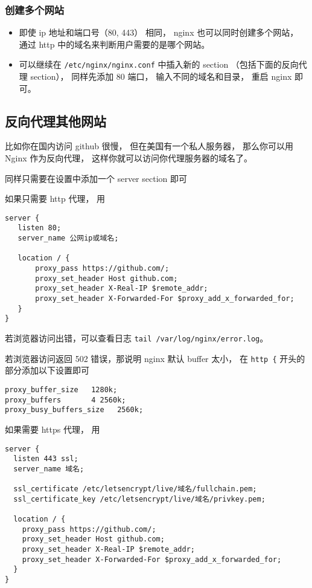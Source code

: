 \subsubsection{创建多个网站}
\begin{itemize}
\item 即使 ip 地址和端口号（80, 443） 相同， nginx 也可以同时创建多个网站， 通过 http 中的域名来判断用户需要的是哪个网站。
\item 可以继续在 \verb`/etc/nginx/nginx.conf` 中插入新的 section （包括下面的反向代理 section）， 同样先添加 80 端口， 输入不同的域名和目录， 重启 nginx 即可。
\end{itemize}


\subsection{反向代理其他网站}
比如你在国内访问 github 很慢， 但在美国有一个私人服务器， 那么你可以用 Nginx 作为反向代理， 这样你就可以访问你代理服务器的域名了。

同样只需要在设置中添加一个 server section 即可

如果只需要 http 代理， 用
\begin{lstlisting}[language=none]
server {
   listen 80;
   server_name 公网ip或域名;

   location / {
       proxy_pass https://github.com/;
       proxy_set_header Host github.com;
       proxy_set_header X-Real-IP $remote_addr;
       proxy_set_header X-Forwarded-For $proxy_add_x_forwarded_for;
   }
}
\end{lstlisting}

若浏览器访问出错，可以查看日志 \verb`tail /var/log/nginx/error.log`。

若浏览器访问返回 502 错误，那说明 nginx 默认 buffer 太小， 在 \verb`http {` 开头的部分添加以下设置即可
\begin{lstlisting}[language=none]
proxy_buffer_size   1280k;
proxy_buffers       4 2560k;
proxy_busy_buffers_size   2560k;
\end{lstlisting}

如果需要 https 代理， 用
\begin{lstlisting}[language=none]
server {
  listen 443 ssl;
  server_name 域名;

  ssl_certificate /etc/letsencrypt/live/域名/fullchain.pem;
  ssl_certificate_key /etc/letsencrypt/live/域名/privkey.pem;

  location / {
    proxy_pass https://github.com/;
    proxy_set_header Host github.com;
    proxy_set_header X-Real-IP $remote_addr;
    proxy_set_header X-Forwarded-For $proxy_add_x_forwarded_for;
  }
}
\end{lstlisting}

